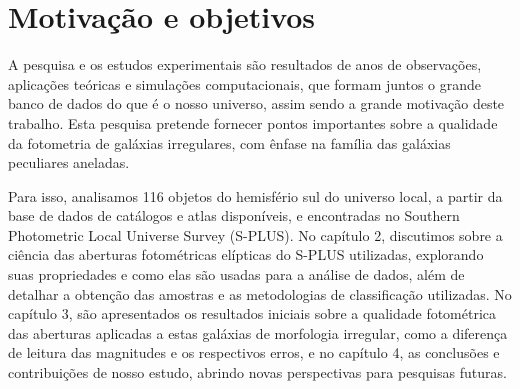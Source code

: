 \section{Motivação e objetivos}

A pesquisa e os estudos experimentais são resultados de anos de observações, aplicações teóricas e simulações computacionais, que formam juntos o grande banco de dados do que é o nosso universo, assim sendo a grande motivação deste trabalho. Esta pesquisa pretende fornecer pontos importantes sobre a qualidade da fotometria de galáxias irregulares, com ênfase na família das galáxias peculiares aneladas.

Para isso, analisamos 116 objetos do hemisfério sul do universo local, a partir da base de dados de catálogos e atlas disponíveis, e encontradas no Southern Photometric Local Universe Survey (S-PLUS). No capítulo 2, discutimos sobre a ciência das aberturas fotométricas elípticas do S-PLUS utilizadas, explorando suas propriedades e como elas são usadas para a análise de dados, além de detalhar a obtenção das amostras e as metodologias de classificação utilizadas. No capítulo 3, são apresentados os resultados iniciais sobre a qualidade fotométrica das aberturas aplicadas a estas galáxias de morfologia irregular, como a diferença de leitura das magnitudes e os respectivos erros, e no capítulo 4, as conclusões e contribuições de nosso estudo, abrindo novas perspectivas para pesquisas futuras.